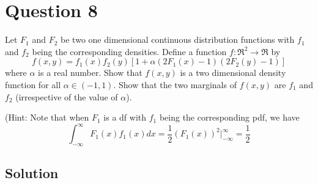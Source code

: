 \section*{Question 8}

Let \( F_{1} \) and \( F_{2} \) be two one dimensional continuous distribution functions with \( f_{1} \) and \( f_{2} \) being the corresponding densities.
Define a function \( f: \Re^{2} \rightarrow \Re \) by
\begin{equation*}
    f(x, y)=f_{1}(x) f_{2}(y)\left[1+\alpha\left(2 F_{1}(x)-1\right)\left(2 F_{2}(y)-1\right)\right]
\end{equation*}
where \( \alpha \) is a real number.
Show that \( f(x, y) \) is a two dimensional density function for all \( \alpha \in(-1,1) \).
Show that the two marginals of \( f(x, y) \) are \( f_{1} \) and \( f_{2} \) (irrespective of the value of \( \alpha \)).

(Hint: Note that when \( F_{1} \) is a df with \( f_{1} \) being the corresponding pdf, we have \[ \int_{-\infty}^{\infty} F_{1}(x) f_{1}(x) d x = \frac{1}{2}{(F_{1}(x))}^{2}\Big|_{-\infty}^{\infty}=\frac{1}{2} \]

\subsection*{Solution}
